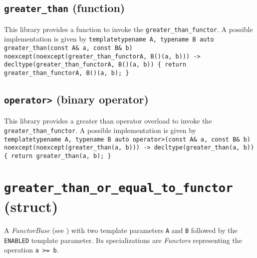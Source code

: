 \documentclass[oneside]{book}
\begin{document}
\subsection{\texttt{greater\_than} (function)}
This library provides a function to invoke the \texttt{greater\_than\_functor}.
A possible implementation is given by\newline
\texttt{template\textlangle typename A, typename B\textrangle\newline
auto\newline
greater\_than(const A\& a, const B\& b)\newline
noexcept(noexcept(greater\_than\_functor\textlangle A, B\textrangle()(a, b)))\newline
-> decltype(greater\_than\_functor\textlangle A, B\textrangle()(a, b))\newline
\{ return greater\_than\_functor\textlangle A, B\textrangle()(a, b); \}}

\subsection{\texttt{operator>} (binary operator)}
This library provides a greater than operator overload to invoke the \texttt{greater\_than\_functor}.
A possible implementation is given by\newline
\texttt{template\textlangle typename A, typename B\textrangle\newline
auto\newline
operator>(const A\& a, const B\& b)\newline
noexcept(noexcept(greater\_than(a, b)))\newline
-> decltype(greater\_than(a, b))\newline
\{ return greater\_than(a, b); \}}

\section{\texttt{greater\_than\_or\_equal\_to\_functor} (struct)}
A \textit{FunctorBase} (see \cite{functors}) with two template parameters \texttt{A} and \texttt{B} followed by the \texttt{ENABLED} template parameter.
Its specializations are \textit{Functors} representing the operation \texttt{a >= b}.
\end{document}
